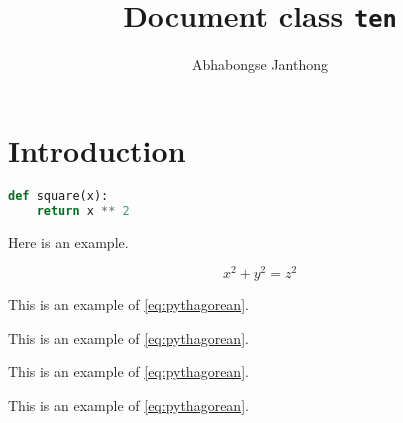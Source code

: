 \documentclass{ten}
\title{Document class \texttt{ten}}
\author{Abhabongse Janthong}
\begin{document}
    \maketitle

    \section{Introduction}
    \label{sec:intro}

    \lipsum[1]

\begin{lstlisting}[language=python,caption={A square function, obviously.}]
def square(x):
    return x ** 2
\end{lstlisting}

    \lipsum[2]

    Here is an example.

    \begin{equation}
        x^2 + y^2 = z^2  \label{eq:pythagorean}
    \end{equation}

    This is an example of \eqref{eq:pythagorean}. \lipsum[3]

    \begin{example}
        This is an example of \autoref{eq:pythagorean}.
    \end{example}

    \lipsum[4]

    \begin{example*}
        This is an example of \autoref{eq:pythagorean}.
    \end{example*}

    \lipsum[5]
    \begin{note}
        This is an example of \autoref{eq:pythagorean}.
    \end{note}
    \lipsum[6]
\end{document}
